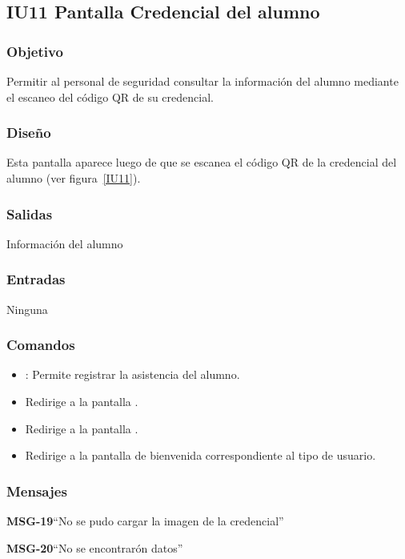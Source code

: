 \subsection{IU11 Pantalla Credencial del alumno}

\subsubsection{Objetivo}
	Permitir al personal de seguridad consultar la información del alumno mediante el escaneo del código QR de su credencial.

\subsubsection{Diseño}
Esta pantalla aparece luego de que se escanea el código QR de la credencial del alumno  (ver figura~\ref{IU11}).
	


\subsubsection{Salidas}
	Información del alumno

\subsubsection{Entradas}
Ninguna

\subsubsection{Comandos}
\begin{itemize}
	\item {}: Permite registrar la asistencia del alumno.
	\item {} Redirige a la pantalla .
    \item {} Redirige a la pantalla .
    \item {} Redirige a la pantalla de bienvenida correspondiente al tipo de usuario.
\end{itemize}

\subsubsection{Mensajes}

\begin{Citemize}
	\item {\bf MSG-19}{``No se pudo cargar la imagen de la credencial''}
	\item {\bf MSG-20}{``No se encontrarón datos''}
\end{Citemize}